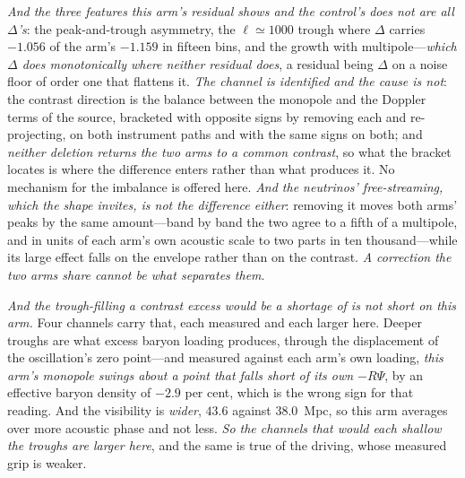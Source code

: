\documentclass[11pt,a4paper]{article}
\theoremstyle{plain}
\theoremstyle{definition}
\theoremstyle{remark}
\begin{document}
\emph{And the three features this arm's residual shows and the control's does not are all $\Delta$'s}: the
peak-and-trough asymmetry, the $\ell\simeq1000$ trough where $\Delta$ carries $-1.056$ of the arm's $-1.159$
in fifteen bins, and the growth with multipole---\emph{which $\Delta$ does monotonically where neither
residual does}, a residual being $\Delta$ on a noise floor of order one that flattens
it.
\emph{The channel is identified and the cause is not}: the contrast direction is the balance between the
monopole and the Doppler terms of the source, bracketed with opposite signs by removing each and
re-projecting, on both instrument paths and with the same signs on both; and \emph{neither deletion
returns the two arms to a common contrast}, so what the bracket locates is where the difference enters
rather than what produces
it.
No mechanism for the imbalance is offered here. \emph{And the neutrinos' free-streaming, which the shape
invites, is not the difference either}: removing it moves both arms' peaks by the same amount---band by
band the two agree to a fifth of a multipole, and in units of each arm's own acoustic scale to two parts
in ten thousand---while its large effect falls on the envelope rather than on the contrast. \emph{A
correction the two arms share cannot be what separates
them}.

\emph{And the trough-filling a contrast excess would be a shortage of is not short on this arm.} Four
channels carry that, each measured and each larger here. Deeper troughs are what excess baryon
loading produces, through the displacement of the oscillation's zero point---and measured against each arm's
own loading, \emph{this arm's monopole swings about a point that falls short of its own $-R\Psi$}, by an
effective baryon density of $-2.9$ per cent, which is the wrong sign for that reading. And the visibility is \emph{wider}, $43.6$ against $38.0$~Mpc, so this arm averages over more acoustic
phase and not less. \emph{So the channels that would each shallow the troughs are larger here}, and the same
is true of the driving, whose measured grip is weaker.
\end{document}
